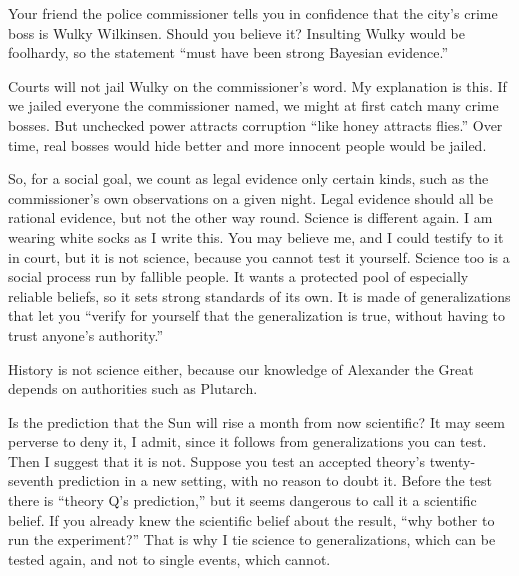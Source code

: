 
Your friend the police commissioner tells you in confidence that the city's crime boss is Wulky Wilkinsen. Should you believe it? Insulting Wulky would be foolhardy, so the statement ``must have been strong Bayesian evidence.'' 

Courts will not jail Wulky on the commissioner's word. My explanation is this. If we jailed everyone the commissioner named, we might at first catch many crime bosses. But unchecked power attracts corruption ``like honey attracts flies.'' Over time, real bosses would hide better and more innocent people would be jailed. 

So, for a social goal, we count as legal evidence only certain kinds, such as the commissioner's own observations on a given night. Legal evidence should all be rational evidence, but not the other way round. Science is different again. I am wearing white socks as I write this. You may believe me, and I could testify to it in court, but it is not science, because you cannot test it yourself. Science too is a social process run by fallible people. It wants a protected pool of especially reliable beliefs, so it sets strong standards of its own. It is made of generalizations that let you ``verify for yourself that the generalization is true, without having to trust anyone's authority.'' 

History is not science either, because our knowledge of Alexander the Great depends on authorities such as Plutarch. 

Is the prediction that the Sun will rise a month from now scientific? It may seem perverse to deny it, I admit, since it follows from generalizations you can test. Then I suggest that it is not. Suppose you test an accepted theory's twenty-seventh prediction in a new setting, with no reason to doubt it. Before the test there is ``theory Q's prediction,'' but it seems dangerous to call it a scientific belief. If you already knew the scientific belief about the result, ``why bother to run the experiment?'' That is why I tie science to generalizations, which can be tested again, and not to single events, which cannot. 


